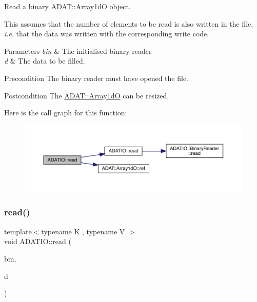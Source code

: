 Read a binary \mbox{\hyperlink{classADAT_1_1Array1dO}{A\+D\+A\+T\+::\+Array1dO}} object. 

This assumes that the number of elements to be read is also written in the file, {\itshape i.\+e}. that the data was written with the corresponding write code. 
\begin{DoxyParams}{Parameters}
{\em bin} & The initialised binary reader \\
\hline
{\em d} & The data to be filled.\\
\hline
\end{DoxyParams}
\begin{DoxyPrecond}{Precondition}
The binary reader must have opened the file. 
\end{DoxyPrecond}
\begin{DoxyPostcond}{Postcondition}
The \mbox{\hyperlink{classADAT_1_1Array1dO}{A\+D\+A\+T\+::\+Array1dO}} can be resized. 
\end{DoxyPostcond}
Here is the call graph for this function\+:\nopagebreak
\begin{figure}[H]
\begin{center}
\leavevmode
\includegraphics[width=350pt]{d0/dba/namespaceADATIO_aee4123faea4044073f3c166dab12cb9e_cgraph}
\end{center}
\end{figure}
\mbox{\label{namespaceADATIO_aae6ee71c391ad98e959febc86231331b}} 
\subsubsection{\texorpdfstring{read()}{read()}\hspace{0.1cm}{\footnotesize\ttfamily [27/28]}}
{\footnotesize\ttfamily template$<$typename K , typename V $>$ \\
void A\+D\+A\+T\+I\+O\+::read (\begin{DoxyParamCaption}\item[{\mbox{\hyperlink{classADATIO_1_1BinaryReader}{Binary\+Reader}} \&}]{bin,  }\item[{std\+::map$<$ K, V $>$ \&}]{d }\end{DoxyParamCaption})\hspace{0.3cm}{\ttfamily [inline]}}



